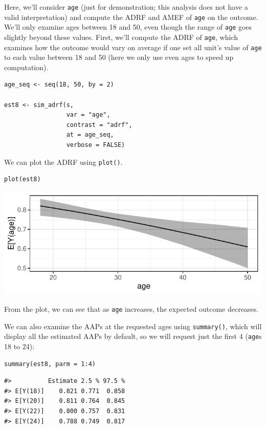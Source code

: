 Here, we'll consider \texttt{age} (just for demonstration; this analysis does not have a valid interpretation) and compute the ADRF and AMEF of \texttt{age} on the outcome. We'll only examine ages between 18 and 50, even though the range of \texttt{age} goes slightly beyond these values. First, we'll compute the ADRF of \texttt{age}, which examines how the outcome would vary on average if one set all unit's value of \texttt{age} to each value between 18 and 50 (here we only use even ages to speed up computation).

\begin{verbatim}
age_seq <- seq(18, 50, by = 2)

est8 <- sim_adrf(s,
                 var = "age",
                 contrast = "adrf",
                 at = age_seq,
                 verbose = FALSE)
\end{verbatim}

We can plot the ADRF using \texttt{plot()}.

\begin{verbatim}
plot(est8)
\end{verbatim}

\begin{center}\includegraphics{figures/unnamed-chunk-25-1} \end{center}

From the plot, we can see that as \texttt{age} increases, the expected outcome decreases.

We can also examine the AAPs at the requested ages using \texttt{summary()}, which will display all the estimated AAPs by default, so we will request just the first 4 (\texttt{age}s 18 to 24):

\begin{verbatim}
summary(est8, parm = 1:4)
\end{verbatim}

\begin{verbatim}
#>          Estimate 2.5 % 97.5 %
#> E[Y(18)]    0.821 0.771  0.858
#> E[Y(20)]    0.811 0.764  0.845
#> E[Y(22)]    0.800 0.757  0.831
#> E[Y(24)]    0.788 0.749  0.817
\end{verbatim}

